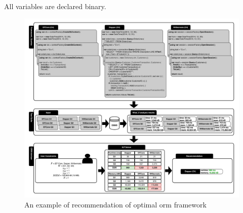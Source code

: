 All variables are declared binary.


\begin{figure}[!htp]
\centering
\includegraphics[width=\textwidth]{thesis/img/thesis/ORM-example.pdf}
\caption{An example of recommendation of optimal \acrshort{orm} framework}
\label{fig:example}
\end{figure}    

